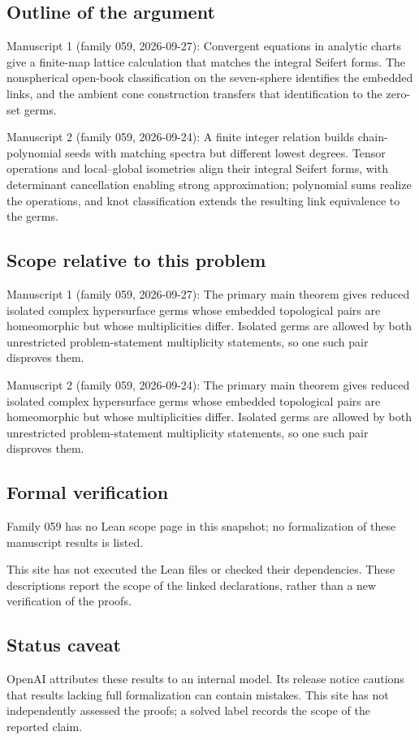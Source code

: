 \documentclass[11pt]{article}
\begin{document}
\subsection{Outline of the argument}
Manuscript 1 (family 059, 2026-09-27): Convergent equations in analytic charts give a finite-map lattice calculation that matches the integral Seifert forms. The nonspherical open-book classification on the seven-sphere identifies the embedded links, and the ambient cone construction transfers that identification to the zero-set germs.

Manuscript 2 (family 059, 2026-09-24): A finite integer relation builds chain-polynomial seeds with matching spectra but different lowest degrees. Tensor operations and local--global isometries align their integral Seifert forms, with determinant cancellation enabling strong approximation; polynomial sums realize the operations, and knot classification extends the resulting link equivalence to the germs.

\subsection{Scope relative to this problem}
Manuscript 1 (family 059, 2026-09-27): The primary main theorem gives reduced isolated complex hypersurface germs whose embedded topological pairs are homeomorphic but whose multiplicities differ. Isolated germs are allowed by both unrestricted problem-statement multiplicity statements, so one such pair disproves them.

Manuscript 2 (family 059, 2026-09-24): The primary main theorem gives reduced isolated complex hypersurface germs whose embedded topological pairs are homeomorphic but whose multiplicities differ. Isolated germs are allowed by both unrestricted problem-statement multiplicity statements, so one such pair disproves them.

\subsection{Formal verification}
Family 059 has no Lean scope page in this snapshot; no formalization of these manuscript results is listed.

This site has not executed the Lean files or checked their dependencies. These descriptions report the scope of the linked declarations, rather than a new verification of the proofs.

\subsection{Status caveat}
OpenAI attributes these results to an internal model. Its release notice cautions that results lacking full formalization can contain mistakes. This site has not independently assessed the proofs; a solved label records the scope of the reported claim.
\end{document}
